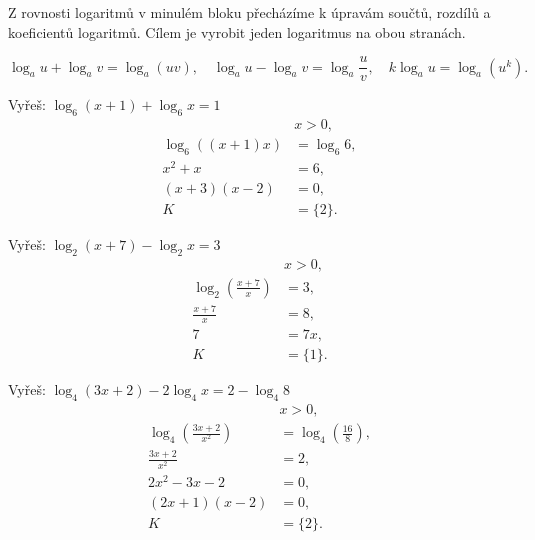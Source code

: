 \documentclass[11pt,a4paper]{article}
\begin{document}
Z rovnosti logaritmů v minulém bloku přecházíme k úpravám součtů, rozdílů a koeficientů logaritmů. Cílem je vyrobit jeden logaritmus na obou stranách.

\[
\log_a u+\log_a v=\log_a(uv),\quad\log_a u-\log_a v=\log_a\!\frac uv,\quad k\log_a u=\log_a(u^k).
\]


\begin{prikladReseniBox}[title={Příklad 1}]
Vyřeš: $\displaystyle \log_6(x+1)+\log_6 x=1$
\tcblower
\[
\begin{aligned}
&x>0,\\
\log_6((x+1)x)&=\log_6 6,\\
x^2+x&=6,\\
(x+3)(x-2)&=0,\\
K&=\{2\}.
\end{aligned}
\]
\end{prikladReseniBox}
\begin{prikladReseniBox}[title={Příklad 2}]
Vyřeš: $\displaystyle \log_2(x+7)-\log_2 x=3$
\tcblower
\[
\begin{aligned}
&x>0,\\
\log_2\!\left(\frac{x+7}{x}\right)&=3,\\
\frac{x+7}{x}&=8,\\
7&=7x,\\
K&=\{1\}.
\end{aligned}
\]
\end{prikladReseniBox}
\begin{prikladReseniBox}[title={Příklad 3}]
Vyřeš: $\displaystyle \log_4(3x+2)-2\log_4 x=2-\log_4 8$
\tcblower
\[
\begin{aligned}
&x>0,\\
\log_4\!\left(\frac{3x+2}{x^2}\right)&=\log_4\!\left(\frac{16}{8}\right),\\
\frac{3x+2}{x^2}&=2,\\
2x^2-3x-2&=0,\\
(2x+1)(x-2)&=0,\\
K&=\{2\}.
\end{aligned}
\]
\end{prikladReseniBox}
\end{document}
